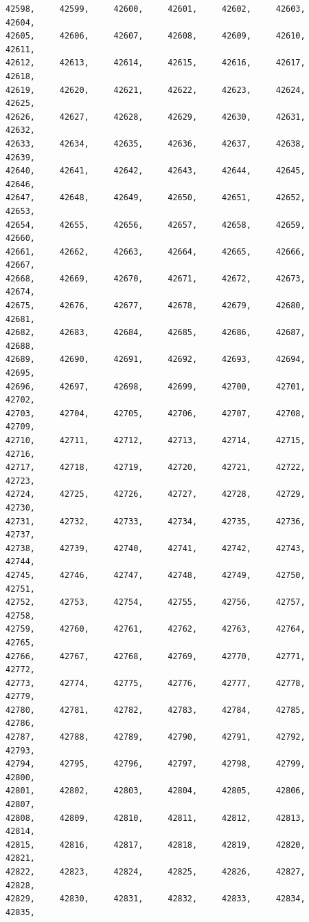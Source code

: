 \documentclass[a4paper,11pt]{report}
\begin{document}
\begin{verbatim}
42598,     42599,     42600,     42601,     42602,     42603,     42604,     
42605,     42606,     42607,     42608,     42609,     42610,     42611,     
42612,     42613,     42614,     42615,     42616,     42617,     42618,     
42619,     42620,     42621,     42622,     42623,     42624,     42625,     
42626,     42627,     42628,     42629,     42630,     42631,     42632,     
42633,     42634,     42635,     42636,     42637,     42638,     42639,     
42640,     42641,     42642,     42643,     42644,     42645,     42646,     
42647,     42648,     42649,     42650,     42651,     42652,     42653,     
42654,     42655,     42656,     42657,     42658,     42659,     42660,     
42661,     42662,     42663,     42664,     42665,     42666,     42667,     
42668,     42669,     42670,     42671,     42672,     42673,     42674,     
42675,     42676,     42677,     42678,     42679,     42680,     42681,     
42682,     42683,     42684,     42685,     42686,     42687,     42688,     
42689,     42690,     42691,     42692,     42693,     42694,     42695,     
42696,     42697,     42698,     42699,     42700,     42701,     42702,     
42703,     42704,     42705,     42706,     42707,     42708,     42709,     
42710,     42711,     42712,     42713,     42714,     42715,     42716,     
42717,     42718,     42719,     42720,     42721,     42722,     42723,     
42724,     42725,     42726,     42727,     42728,     42729,     42730,     
42731,     42732,     42733,     42734,     42735,     42736,     42737,     
42738,     42739,     42740,     42741,     42742,     42743,     42744,     
42745,     42746,     42747,     42748,     42749,     42750,     42751,     
42752,     42753,     42754,     42755,     42756,     42757,     42758,     
42759,     42760,     42761,     42762,     42763,     42764,     42765,     
42766,     42767,     42768,     42769,     42770,     42771,     42772,     
42773,     42774,     42775,     42776,     42777,     42778,     42779,     
42780,     42781,     42782,     42783,     42784,     42785,     42786,     
42787,     42788,     42789,     42790,     42791,     42792,     42793,     
42794,     42795,     42796,     42797,     42798,     42799,     42800,     
42801,     42802,     42803,     42804,     42805,     42806,     42807,     
42808,     42809,     42810,     42811,     42812,     42813,     42814,     
42815,     42816,     42817,     42818,     42819,     42820,     42821,     
42822,     42823,     42824,     42825,     42826,     42827,     42828,     
42829,     42830,     42831,     42832,     42833,     42834,     42835,     

\end{verbatim}
\end{document}
